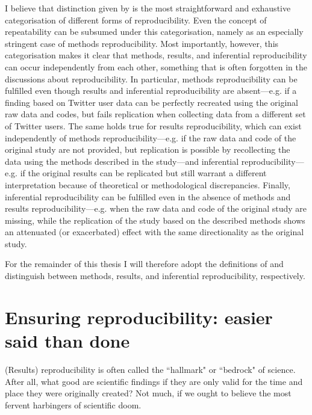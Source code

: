 \documentclass[11pt, a4paper,twoside]{report}\usepackage[]{graphicx}\usepackage[]{color}
\begin{document}
I believe that distinction given by \cite{goodman_what_2016} is the most straightforward and exhaustive categorisation of different forms of reproducibility. Even the concept of repeatability can be subsumed under this categorisation, namely as an especially stringent case of methods reproducibility. Most importantly, however, this categorisation makes it clear that methods, results, and inferential reproducibility can occur independently from each other, something that is often forgotten in the discussions about reproducibility. In particular, methods reproducibility can be fulfilled even though results and inferential reproducibility are absent---e.g. if a finding based on Twitter user data can be perfectly recreated using the original raw data and codes, but fails replication when collecting data from a different set of Twitter users. The same holds true for results reproducibility, which can exist independently of methods reproducibility---e.g. if the raw data and code of the original study are not provided, but replication is possible by recollecting the data using the methods described in the study---and inferential reproducibility---e.g. if the original results can be replicated but still warrant a different interpretation because of theoretical or methodological discrepancies. Finally, inferential reproducibility can be fulfilled even in the absence of methods and results reproducibility---e.g. when the raw data and code of the original study are missing, while the replication of the study based on the described methods shows an attenuated (or exacerbated) effect with the same directionality as the original study.

For the remainder of this thesis I will therefore adopt the definitions of \cite{goodman_what_2016} and distinguish between methods, results, and inferential reproducibility, respectively.

\section{Ensuring reproducibility: easier said than done}
(Results) reproducibility is often called the ``hallmark" \citep{aarts2015estimating,munafo_manifesto_2017} or ``bedrock" \citep{casadevall_reproducible_2010} of science. After all, what good are scientific findings if they are only valid for the time and place they were originally created? Not much, if we ought to believe the most fervent harbingers of scientific doom.
\end{document}

